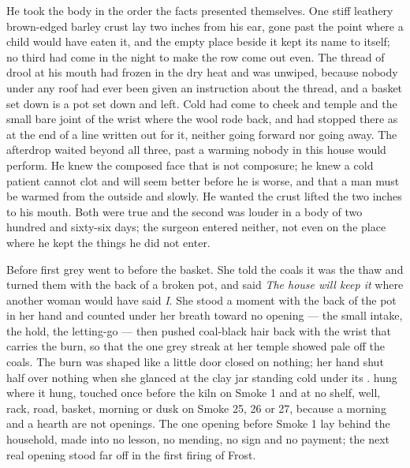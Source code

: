 He took the body in the order the facts presented themselves. One stiff leathery brown-edged barley crust lay two inches from his ear, gone past the point where a child would have eaten it, and the empty place beside it kept its name to itself; no third had come in the night to make the row come out even. The thread of drool at his mouth had frozen in the dry heat and was unwiped, because nobody under any roof had ever been given an instruction about the thread, and a basket set down is a pot set down and left. Cold had come to cheek and temple and the small bare joint of the wrist where the wool rode back, and had stopped there as at the end of a line written out for it, neither going forward nor going away. The afterdrop waited beyond all three, past a warming nobody in this house would perform. He knew the composed face that is not composure; he knew a cold patient cannot clot and will seem better before he is worse, and that a man must be warmed from the outside and slowly. He wanted the crust lifted the two inches to his mouth. Both were true and the second was louder in a body of two hundred and sixty-six days; the surgeon entered neither, not even on the place where he kept the things he did not enter.

\scenebreak

Before first grey  went to  before the basket. She told the coals it was the thaw and turned them with the back of a broken pot, and said \emph{The house will keep it} where another woman would have said \emph{I}. She stood a moment with the back of the pot in her hand and counted under her breath toward no opening --- the small intake, the hold, the letting-go --- then pushed coal-black hair back with the wrist that carries the burn, so that the one grey streak at her temple showed pale off the coals. The burn was shaped like a little door closed on nothing; her hand shut half over nothing when she glanced at the clay jar standing cold under its .  hung where it hung, touched once before the kiln on Smoke 1 and at no shelf, well, rack, road, basket, morning or dusk on Smoke 25, 26 or 27, because a morning and a hearth are not openings. The one opening before Smoke 1 lay behind the household, made into no lesson, no mending, no sign and no payment; the next real opening stood far off in the first firing of Frost.

